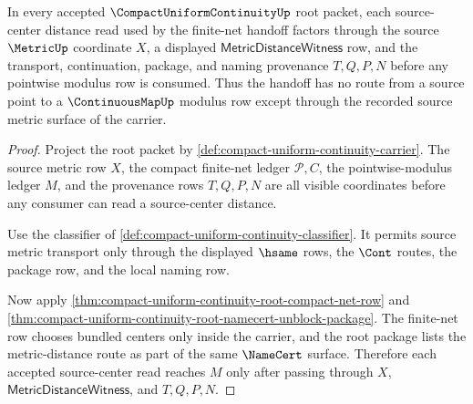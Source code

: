 \begin{theorem}
\label{thm:compact-uniform-continuity-source-metric-totality}
In every accepted $\CompactUniformContinuityUp$ root packet, each source-center distance read used by the finite-net handoff factors through the source $\MetricUp$ coordinate $X$, a displayed $\mathsf{MetricDistanceWitness}$ row, and the transport, continuation, package, and naming provenance $T,Q,P,N$ before any pointwise modulus row is consumed. Thus the handoff has no route from a source point to a $\ContinuousMapUp$ modulus row except through the recorded source metric surface of the carrier.
\end{theorem}
\begin{proof}
Project the root packet by \autoref{def:compact-uniform-continuity-carrier}. The source metric row $X$, the compact finite-net ledger $\mathcal{P},C$, the pointwise-modulus ledger $M$, and the provenance rows $T,Q,P,N$ are all visible coordinates before any consumer can read a source-center distance.

Use the classifier of \autoref{def:compact-uniform-continuity-classifier}. It permits source metric transport only through the displayed $\hsame$ rows, the $\Cont$ routes, the package row, and the local naming row.

Now apply \autoref{thm:compact-uniform-continuity-root-compact-net-row} and \autoref{thm:compact-uniform-continuity-root-namecert-unblock-package}. The finite-net row chooses bundled centers only inside the carrier, and the root package lists the metric-distance route as part of the same $\NameCert$ surface. Therefore each accepted source-center read reaches $M$ only after passing through $X$, $\mathsf{MetricDistanceWitness}$, and $T,Q,P,N$.
\end{proof}

